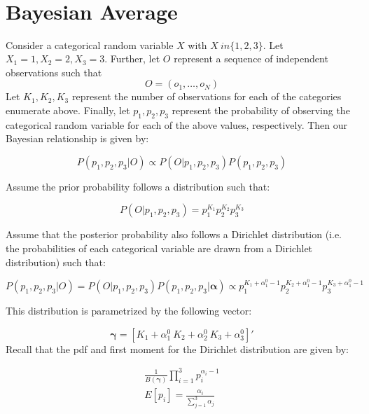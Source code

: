 \documentclass{article}
\title{
	\vspace{2in}
	\textmd{\textbf{\docClass}\\
		\vspace{0.35in}	
		\textmd{\docTitle}}\\
	\vspace{3in}
}
\author{\textbf{\docAuthorName}}
\date{}
\theoremstyle{plain}
\theoremstyle{definition}
\theoremstyle{remark}
\renewcommand{\vec}[1]{\bm{#1}}
\begin{document}
\section{Bayesian Average}

Consider a categorical random variable $X$ with $X \ in \{ 1, 2, 3 \}$. Let $X_{1} = 1, X_{2} = 2, X_{3} = 3$. Further, let $O$ represent a sequence of independent observations such that
\begin{equation*}
O = (o_{1}, \dots, o_{N})
\end{equation*}
Let $K_{1}, K_{2}, K_{3}$ represent the number of observations for each of the categories enumerate above. Finally, let $p_{1}, p_{2}, p_{3}$ represent the probability of observing the categorical random variable for each of the above values, respectively. Then our Bayesian relationship is given by:

\begin{equation*}
P(p_{1}, p_{2}, p_{3}|O) \propto  P(O|p_{1}, p_{2}, p_{3})P(p_{1}, p_{2}, p_{3})
\end{equation*}

\noindent Assume the prior probability follows a distribution such that:

\begin{equation*}
 P(O|p_{1}, p_{2}, p_{3}) = p_{1}^{K_{1}}p_{2}^{K_{2}}p_{3}^{K_{3}} 
\end{equation*}

\noindent Assume that the posterior probability also follows a Dirichlet distribution (i.e. the probabilities of each categorical variable are drawn from a Dirichlet distribution) such that:

\begin{equation*}
P(p_{1}, p_{2}, p_{3}|O) = P(O|p_{1}, p_{2}, p_{3})P(p_{1}, p_{2}, p_{3}|\boldsymbol \alpha) \propto p_{1}^{K_{1}+\alpha_{1}^{0} - 1}p_{2}^{K_{2} +\alpha_{1}^{0} - 1}p_{3}^{K_{3} +\alpha_{1}^{0} - 1} 
\end{equation*}

\noindent This distribution is parametrized by the following vector:

\begin{equation*}
\boldsymbol \gamma = [K_{1}+\alpha_{1}^{0} \: K_{2} +\alpha_{2}^{0} \: K_{3} +\alpha_{3}^{0}]'
\end{equation*}
Recall that the pdf and first moment for the Dirichlet distribution are given by:

\begin{align*}
\frac{1}{B(\vec{\gamma})} \prod_{i=1}^{3} p_{i}^{\alpha_{i} - 1}
\\
E[p_{i}] = \frac{\alpha_{i}}{\sum_{j=1}^{3} \alpha_{j}}
\end{align*}
\end{document}
